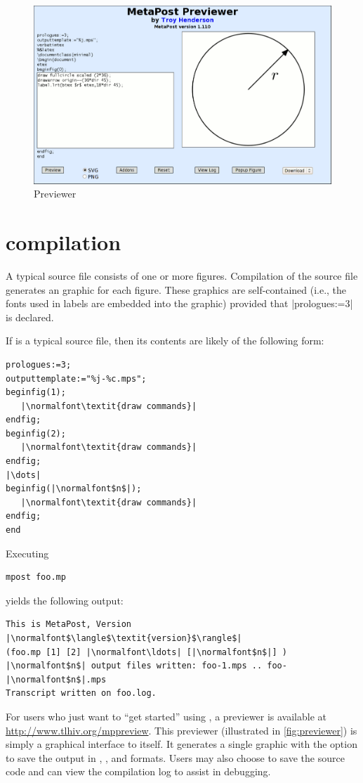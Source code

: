 \begin{figure}[tp]
  \centering
  \includegraphics[width=\textwidth]{previewer}
  \caption{\MP{} Previewer}
  \label{fig:previewer}
\end{figure}

\section{\MP{} compilation}
\label{sec:mpcompilation}

A typical \MP{} source file consists of one or more figures.
Compilation of the source file generates an \EPS{} graphic for each
figure.  These \EPS{} graphics are self-contained (i.e., the fonts used
in labels are embedded into the graphic) provided that |prologues:=3| is
declared.

If  is a typical \MP{} source file, then its contents are
likely of the following form:

\begin{lstlisting}[style=MP]
prologues:=3;
outputtemplate:="%j-%c.mps";
beginfig(1);
   |\normalfont\textit{draw commands}|
endfig;
beginfig(2);
   |\normalfont\textit{draw commands}|
endfig;
|\dots|
beginfig(|\normalfont$n$|);
   |\normalfont\textit{draw commands}|
endfig;
end
\end{lstlisting}

Executing

\begin{lstlisting}[style=text]
mpost foo.mp
\end{lstlisting}
yields the following output:

\begin{lstlisting}[style=text]
This is MetaPost, Version |\normalfont$\langle$\textit{version}$\rangle$|
(foo.mp [1] [2] |\normalfont\ldots| [|\normalfont$n$|] )
|\normalfont$n$| output files written: foo-1.mps .. foo-|\normalfont$n$|.mps
Transcript written on foo.log.
\end{lstlisting}

For users who just want to ``get started'' using \MP{}, a \MP{}
previewer is available at \url{http://www.tlhiv.org/mppreview}.  This
previewer (illustrated in \autoref{fig:previewer}) is simply a graphical
interface to \MP{} itself.  It generates a single graphic with the
option to save the output in \EPS{}, \PDF{}, and \SVG{} formats.  Users
may also choose to save the source code and can view the compilation log
to assist in debugging.

